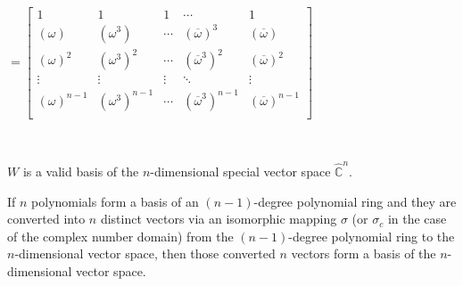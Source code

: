 \text{ } \text{ }  $= \begin{bmatrix}
1 & 1 & 1 & \cdots & 1\\
(\omega) & (\omega^3) & \cdots & (\overline{\omega})^3 & (\overline{\omega})\\
(\omega)^2 & (\omega^3)^2 & \cdots & (\overline{\omega}^3)^2 & (\overline{\omega})^2\\
\vdots & \vdots & \vdots & \ddots & \vdots \\
(\omega)^{n-1} & (\omega^3)^{n-1} & \cdots & (\overline{\omega}^3)^{n-1} & (\overline{\omega})^{n-1}\\
\end{bmatrix}$

$ $

$W$ is a valid basis of the $n$-dimensional special vector space $\hat{\mathbb C}^{n}$. 



\begin{tcolorbox}[title={\textbf{\tboxtheorem{\ref*{subsec:poly-vector-transformation-complex}} Transforming Basis between Polynomial Ring and Vector Space}}]

If $n$ polynomials form a basis of an $(n-1)$-degree polynomial ring and they are converted into $n$ distinct vectors via an isomorphic mapping $\sigma$ (or $\sigma_c$ in the case of the complex number domain) from the $(n-1)$-degree polynomial ring to the $n$-dimensional vector space, then those converted $n$ vectors form a basis of the $n$-dimensional vector space. 

\end{tcolorbox}